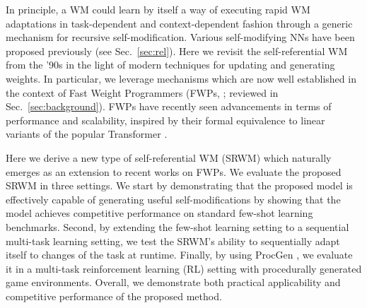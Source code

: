 \documentclass[nohyperref]{article}
\theoremstyle{plain}
\theoremstyle{definition}
\theoremstyle{remark}
\begin{document}
In principle, a WM could learn by itself a way of executing  rapid WM adaptations in task-dependent and context-dependent fashion through a generic mechanism for recursive self-modification.
Various self-modifying NNs have been proposed previously (see Sec.~\ref{sec:rel}).
Here we revisit the self-referential WM \citep{Schmidhuber:92selfref, Schmidhuber:93selfrefann, Schmidhuber:93selfreficann, Schmidhuber:93selfrefieee} from the '90s in the light of modern techniques for updating and generating weights.
In particular, we leverage mechanisms which are now well established in the context of Fast Weight Programmers (FWPs, \citet{Schmidhuber:91fastweights, schmidhuber1992learning, schmidhuber1993reducing}; reviewed in Sec.~\ref{sec:background}).
FWPs have recently seen advancements in terms of
performance and scalability, inspired by their formal equivalence \citep{schlag2021linear}
to linear variants \citep{katharopoulos2020transformers, choromanski2020rethinking, peng2021random} of the popular Transformer \citep{trafo}.

Here we derive a new type of self-referential WM (SRWM)
which naturally emerges as an extension to recent works on FWPs.
We evaluate the proposed SRWM in three settings.
We start by demonstrating that the proposed model
is effectively capable of generating useful self-modifications
by showing that the model achieves competitive performance on standard few-shot learning benchmarks.
Second, by extending the few-shot learning setting
to a sequential multi-task learning setting,
we test the SRWM's ability to sequentially adapt itself to changes of the task at runtime.
Finally, by using ProcGen \citep{CobbeHHS20}, we evaluate it
in a multi-task reinforcement learning (RL) setting with procedurally generated game environments.
Overall, we demonstrate both practical applicability and competitive performance of the proposed method.
\end{document}
